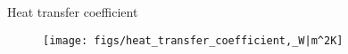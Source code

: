 \begin{frame}{Heat transfer coefficient}

    \scriptsize

    \begin{figure}[h]
        \texttt{[image: figs/heat\_transfer\_coefficient,\_W|m^2K]}
    \end{figure}

\end{frame}